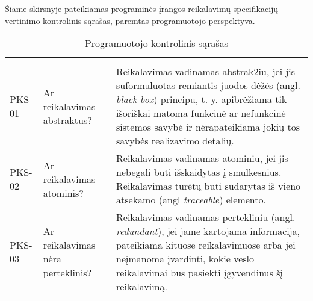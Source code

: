 \documentclass{VUMIFPSkursinis}
\begin{document}
Šiame skirsnyje pateikiamas programinės įrangos reikalavimų specifikacijų vertinimo kontrolinis sąrašas,
paremtas programuotojo perspektyva.

\begin{center}
	\small
	\begin{longtable}{|C{2cm}|L{5cm}|L{8cm}|}
		\caption{Programuotojo kontrolinis sąrašas}
		\label{table:EmployeeSalary}
		\\ \hline
		                               &
		                   &
		\\ \hline
		PKS-01                                                                        &
		Ar reikalavimas abstraktus?                                                   &
		Reikalavimas vadinamas abstrak2iu, jei jis suformuluotas remiantis juodos dėžės (angl. \textit{black box}) principu, t. y. apibrėžiama tik išoriškai matoma funkcinė ar nefunkcinė sistemos savybė ir nėrapateikiama jokių tos savybės realizavimo detalių.                                                                                                                                                                                   \\ \hline
		PKS-02                                                                        &
		Ar reikalavimas atominis?                                                     &
		Reikalavimas vadinamas atominiu, jei jis nebegali būti išskaidytas į smulkesnius. Reikalavimas turėtų būti sudarytas iš vieno atsekamo (angl \textit{traceable}) elemento.                                                                                                                                                                                                                                                                    \\ \hline
		PKS-03                                                                        &
		Ar reikalavimas nėra perteklinis?                                             &
		Reikalavimas vadinamas pertekliniu (angl. \textit{redundant}), jei jame kartojama informacija, pateikiama kituose reikalavimuose arba jei neįmanoma įvardinti, kokie veslo reikalavimai bus pasiekti įgyvendinus šį reikalavimą.                                                                                                                                                                                                              \\ \hline

\end{longtable}
\end{center}
\end{document}

